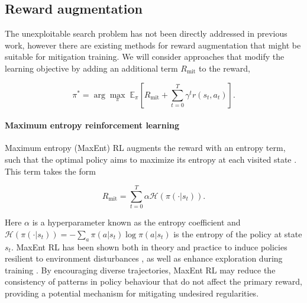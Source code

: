 \subsection{Reward augmentation}

The unexploitable search problem has not been directly addressed in previous work, however there are existing methods for reward augmentation that might be suitable for mitigation training. We will consider approaches that modify the learning objective by adding an additional term $R_{\mathrm{mit}}$ to the reward, 

\begin{equation}
    \pi^* = \arg \underset{\pi}{\max}\;\mathbb{E}_\pi\left[  R_{\mathrm{mit}}+\sum^T_{t=0}\gamma^t r(s_t, a_t)\right].
\end{equation}

\paragraph{Maximum entropy reinforcement learning}

Maximum entropy (MaxEnt) RL augments the reward with an entropy term, such that the optimal policy aims to maximize its entropy at each visited state \citep{haarnoja_energybased_policies_2017}. This term takes the form

\begin{equation}
     R_{\mathrm{mit}} = \sum^T_{t=0}\alpha\mathcal{H}(\pi(\cdot|s_t)).
\end{equation}

Here $\alpha$ is a hyperparameter known as the entropy coefficient and $\mathcal{H}(\pi(\cdot|s_t)) = -\sum_a\pi(a|s_t)\log\pi(a|s_t)$ is the entropy of the policy at state $s_t$. MaxEnt RL has been shown both in theory and practice to induce policies resilient to environment disturbances \cite{eysenbach_diversity_2018}, as well as enhance exploration during training \citep{cui_entropy_2025}. By encouraging diverse trajectories, MaxEnt RL may reduce the consistency of patterns in policy behaviour that do not affect the primary reward, providing a potential mechanism for mitigating undesired regularities.


